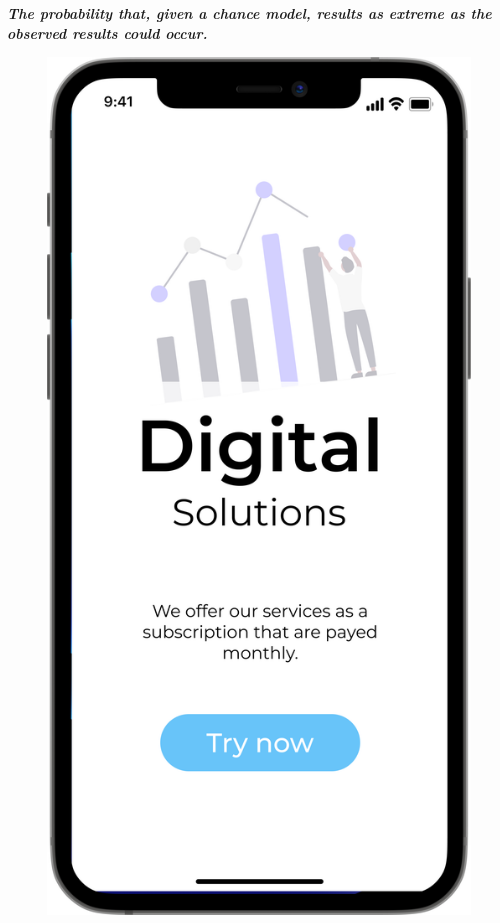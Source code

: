 \textit{\textbf{The probability that, given a chance model, results as extreme as the observed results could occur.}}


\begin{figure}[H]
  \centering
  \begin{minipage}[b]{0.45\textwidth}
    \includegraphics[width=\linewidth]{images/A.png}

\end{minipage}
\end{figure}
